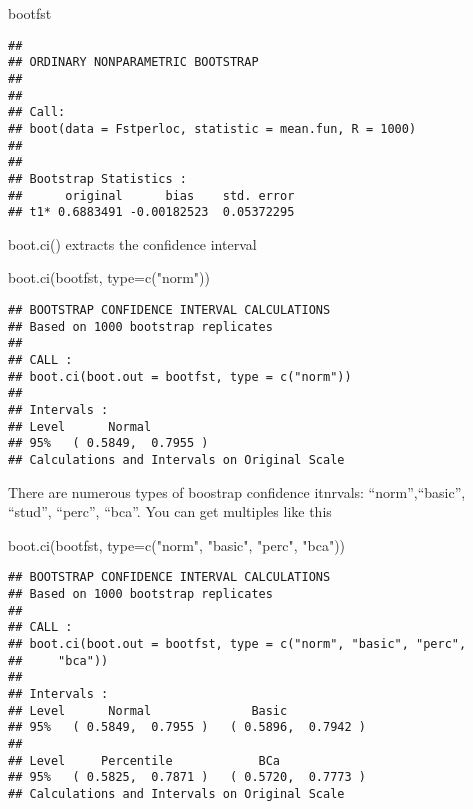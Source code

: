 \documentclass[
]{book}
\newenvironment{Shaded}{\begin{snugshade}}{\end{snugshade}}
\newcommand{\AttributeTok}[1]{\textcolor[rgb]{0.77,0.63,0.00}{#1}}
\newcommand{\FunctionTok}[1]{\textcolor[rgb]{0.00,0.00,0.00}{#1}}
\newcommand{\NormalTok}[1]{#1}
\newcommand{\StringTok}[1]{\textcolor[rgb]{0.31,0.60,0.02}{#1}}
\begin{document}
\begin{Shaded}
\begin{Highlighting}[]
\NormalTok{bootfst}
\end{Highlighting}
\end{Shaded}

\begin{verbatim}
## 
## ORDINARY NONPARAMETRIC BOOTSTRAP
## 
## 
## Call:
## boot(data = Fstperloc, statistic = mean.fun, R = 1000)
## 
## 
## Bootstrap Statistics :
##      original      bias    std. error
## t1* 0.6883491 -0.00182523  0.05372295
\end{verbatim}

boot.ci() extracts the confidence interval

\begin{Shaded}
\begin{Highlighting}[]
\FunctionTok{boot.ci}\NormalTok{(bootfst, }\AttributeTok{type=}\FunctionTok{c}\NormalTok{(}\StringTok{"norm"}\NormalTok{))}
\end{Highlighting}
\end{Shaded}

\begin{verbatim}
## BOOTSTRAP CONFIDENCE INTERVAL CALCULATIONS
## Based on 1000 bootstrap replicates
## 
## CALL : 
## boot.ci(boot.out = bootfst, type = c("norm"))
## 
## Intervals : 
## Level      Normal        
## 95%   ( 0.5849,  0.7955 )  
## Calculations and Intervals on Original Scale
\end{verbatim}

There are numerous types of boostrap confidence itnrvals: ``norm'',``basic'', ``stud'', ``perc'', ``bca''. You can get multiples like this

\begin{Shaded}
\begin{Highlighting}[]
\FunctionTok{boot.ci}\NormalTok{(bootfst, }\AttributeTok{type=}\FunctionTok{c}\NormalTok{(}\StringTok{"norm"}\NormalTok{,}
                        \StringTok{"basic"}\NormalTok{,}
                        \StringTok{"perc"}\NormalTok{,}
                        \StringTok{"bca"}\NormalTok{))}
\end{Highlighting}
\end{Shaded}

\begin{verbatim}
## BOOTSTRAP CONFIDENCE INTERVAL CALCULATIONS
## Based on 1000 bootstrap replicates
## 
## CALL : 
## boot.ci(boot.out = bootfst, type = c("norm", "basic", "perc", 
##     "bca"))
## 
## Intervals : 
## Level      Normal              Basic         
## 95%   ( 0.5849,  0.7955 )   ( 0.5896,  0.7942 )  
## 
## Level     Percentile            BCa          
## 95%   ( 0.5825,  0.7871 )   ( 0.5720,  0.7773 )  
## Calculations and Intervals on Original Scale
\end{verbatim}
\end{document}
